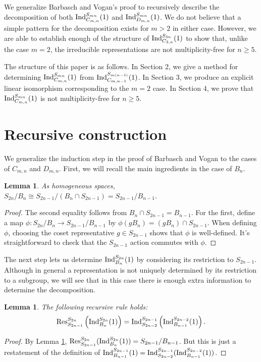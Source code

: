\documentclass[12pt]{amsart}
\newtheorem{lemma}[theorem]{Lemma}
\numberwithin{theorem}{section}
\newcommand{\Ind}{\textup{Ind}}
\newcommand{\Res}{\textup{Res}}
\begin{document}
We generalize Barbasch and Vogan's proof to recursively describe the decomposition of both $\Ind_{C_{m,n}}^{S_{mn}}(1)$ and $\Ind_{D_{m,n}}^{S_{mn}}(1)$.
We do not believe that a simple pattern for the decomposition exists for $m > 2$ in either case.
However, we are able to establish enough of the structure of $\Ind_{C_{3,n}}^{S_{3n}}(1)$ to show that, unlike the case $m=2$,
the irreducible representations are not multiplicity-free for $n \ge 5$.

The structure of this paper is as follows.
In Section 2, we give a method for determining $\Ind_{C_{m,n}}^{S_{mn}}(1)$ from $\Ind_{C_{m,n-1}}^{S_{m(n-1)}}(1)$.
In Section 3, we produce an explicit linear isomorphism corresponding to the $m=2$ case.
In Section 4, we prove that $\Ind_{C_{m,n}}^{S_{mn}}(1)$ is not multiplicity-free for $n \ge 5$.

\section{Recursive construction}
We generalize the induction step in the proof of Barbasch and Vogan to the cases of $C_{m,n}$ and $D_{m,n}$.
First, we will recall the main ingredients in the case of $B_n$.

\begin{lemma}\label{BV:lemma1}
As homogeneous spaces, 
$S_{2n}/B_n \cong S_{2n-1}/(B_n \cap S_{2n-1}) = S_{2n-1}/B_{n-1}$.
\end{lemma}
\begin{proof}
The second equality follows from $B_n \cap S_{2n-1} = B_{n-1}$.
For the first, define a map $\phi: S_{2n} / B_n \to S_{2n-1}/B_{n-1}$ by $\phi(gB_n) = (gB_n) \cap S_{2n-1}$.
When defining $\phi$, choosing the coset representative $g \in S_{2n-1}$ shows that $\phi$ is well-defined.
It's straightforward to check that the $S_{2n-1}$ action commutes with $\phi$.
\end{proof}

The next step lets us determine $\Ind_{B_n}^{S_{2n}}(1)$ by considering its restriction to $S_{2n-1}$.
Although in general a representation is not uniquely determined by its restriction to a subgroup, we will see that in this case there is enough extra information to determine the decomposition.

\begin{lemma}\label{BV:lemma2}
The following recursive rule holds:
$$\Res_{S_{2n-1}}^{S_{2n}}\left(\Ind_{B_n}^{S_{2n}}(1)\right) = \Ind_{S_{2n-2}}^{S_{2n-1}}\left(\Ind_{B_{n-1}}^{S_{2n-2}}(1)\right).$$
\end{lemma}
\begin{proof}
By Lemma \ref{BV:lemma1}, $\Res_{S_{2n-1}}^{S_{2n}}(\Ind_{B_n}^{S_{2n}}(1)) = S_{2n-1}/B_{n-1}$.
But this is just a restatement
of the definition of $ \Ind_{B_{n-1}}^{S_{2n-1}} (1) = \Ind_{S_{2n-2}}^{S_{2n-1}}(\Ind_{B_{n-1}}^{S_{2n-2}}(1))$.
\end{proof}
\end{document}
